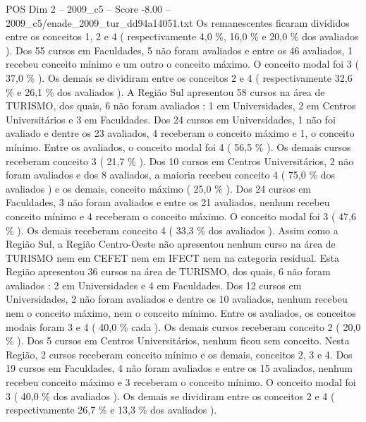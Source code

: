 \begin{textsample}{POS Dim 2 – 2009\_c5 – Score -8.00 – 2009\_c5/enade\_2009\_tur\_dd94a14051.txt}
Os remanescentes ficaram divididos entre os conceitos 1, 2 e 4 ( respectivamente 4,0 \%, 16,0 \% e 20,0 \% dos avaliados ).
Dos 55 cursos em Faculdades, 5 não foram avaliados e entre os 46 avaliados, 1 recebeu conceito mínimo e um outro o conceito máximo.
O conceito modal foi 3 ( 37,0 \% ).
Os demais se dividiram entre os conceitos 2 e 4 ( respectivamente 32,6 \% e 26,1 \% dos avaliados ).
A Região Sul apresentou 58 cursos na área de TURISMO, dos quais, 6 não foram avaliados : 1 em Universidades, 2 em Centros Universitários e 3 em Faculdades.
Dos 24 cursos em Universidades, 1 não foi avaliado e dentre os 23 avaliados, 4 receberam o conceito máximo e 1, o conceito mínimo.
Entre os avaliados, o conceito modal foi 4 ( 56,5 \% ).
Os demais cursos receberam conceito 3 ( 21,7 \% ).
Dos 10 cursos em Centros Universitários, 2 não foram avaliados e dos 8 avaliados, a maioria recebeu conceito 4 ( 75,0 \% dos avaliados ) e os demais, conceito máximo ( 25,0 \% ).
Dos 24 cursos em Faculdades, 3 não foram avaliados e entre os 21 avaliados, nenhum recebeu conceito mínimo e 4 receberam o conceito máximo.
O conceito modal foi 3 ( 47,6 \% ).
Os demais receberam conceito 4 ( 33,3 \% dos avaliados ).
Assim como a Região Sul, a Região Centro-Oeste não apresentou nenhum curso na área de TURISMO nem em CEFET nem em IFECT nem na categoria residual.
Esta Região apresentou 36 cursos na área de TURISMO, dos quais, 6 não foram avaliados : 2 em Universidades e 4 em Faculdades.
Dos 12 cursos em Universidades, 2 não foram avaliados e dentre os 10 avaliados, nenhum recebeu nem o conceito máximo, nem o conceito mínimo.
Entre os avaliados, os conceitos modais foram 3 e 4 ( 40,0 \% cada ).
Os demais cursos receberam conceito 2 ( 20,0 \% ).
Dos 5 cursos em Centros Universitários, nenhum ficou sem conceito.
Nesta Região, 2 cursos receberam conceito mínimo e os demais, conceitos 2, 3 e 4.
Dos 19 cursos em Faculdades, 4 não foram avaliados e entre os 15 avaliados, nenhum recebeu conceito máximo e 3 receberam o conceito mínimo.
O conceito modal foi 3 ( 40,0 \% dos avaliados ).
Os demais se dividiram entre os conceitos 2 e 4 ( respectivamente 26,7 \% e 13,3 \% dos avaliados ).

\end{textsample}
